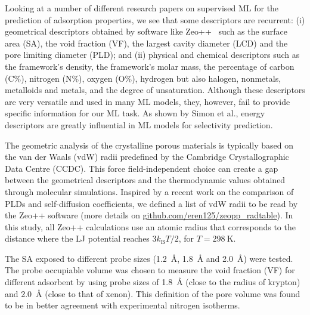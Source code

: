 \documentclass[main]{subfiles}
\begin{document}
Looking at a number of different research papers on supervised ML for the prediction of adsorption properties,\autocite{Fernandez_2013,Simon_2015,Fanourgakis_2020,Anderson_2020,Pardakhti_2020} we see that some descriptors are recurrent: (i) geometrical descriptors obtained by software like Zeo++~\autocite{zeopp_Willems2012} such as the surface area (SA), the void fraction (VF), the largest cavity diameter (LCD) and the pore limiting diameter (PLD); and (ii) physical and chemical descriptors such as the framework's density, the framework's molar mass, the percentage of carbon (C\%), nitrogen (N\%), oxygen (O\%), hydrogen but also halogen, nonmetals, metalloids and metals, and the degree of unsaturation. Although these descriptors are very versatile and used in many ML models, they, however, fail to provide specific information for our ML task. As shown by Simon et al., energy descriptors are greatly influential in ML models for selectivity prediction.

The geometric analysis of the crystalline porous materials is typically based on the van der Waals (vdW) radii predefined by the Cambridge Crystallographic Data Centre (CCDC). This force field-independent choice can create a gap between the geometrical descriptors and the thermodynamic values obtained through molecular simulations. Inspired by a recent work on the comparison of PLDs and self-diffusion coefficients,\autocite{Hung_2021} we defined a list of vdW radii to be read by the Zeo++ software (more details on \url{github.com/eren125/zeopp_radtable}). In this study, all Zeo++ calculations use an atomic radius that corresponds to the distance where the LJ potential reaches $3 k_\text{B} T/2$, for $T = \SI{298}{\kelvin}$.

The SA exposed to different probe sizes (\SI{1.2}{\angstrom}, \SI{1.8}{\angstrom} and \SI{2.0}{\angstrom}) were tested. The probe occupiable volume was chosen to measure the void fraction (VF) for different adsorbent by using probe sizes of \SI{1.8}{\angstrom} (close to the radius of krypton) and \SI{2.0}{\angstrom} (close to that of xenon). This definition of the pore volume was found to be in better agreement with experimental nitrogen isotherms.\autocite{vol_Ongari2017}
\end{document}
